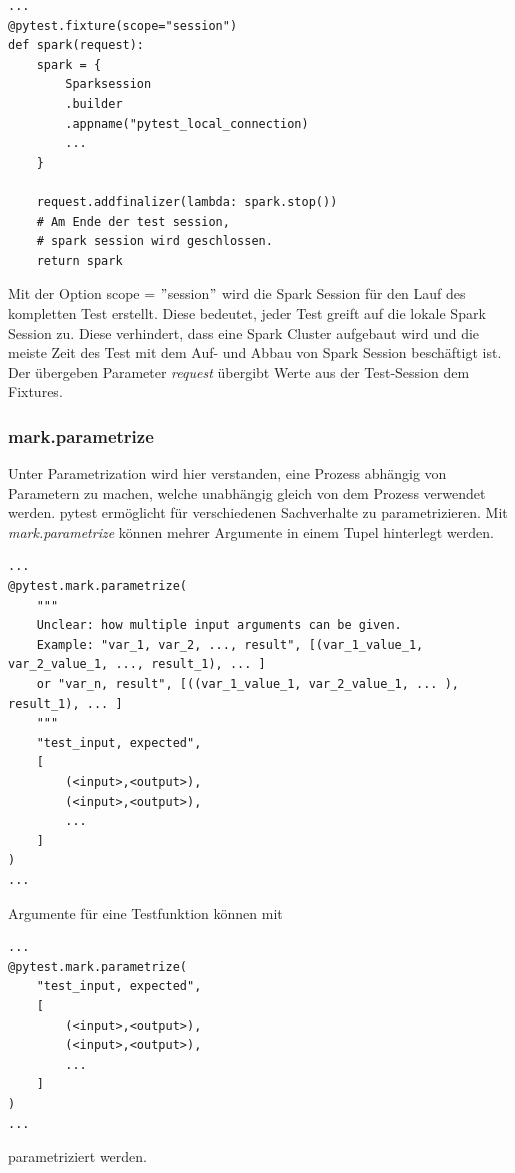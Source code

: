 \begin{lstlisting}[style=Config, caption={Beispiel pyproject.toml; Slapping pytest config}, captionpos=b]
...
@pytest.fixture(scope="session")
def spark(request):
	spark = {
		Sparksession
		.builder
		.appname("pytest_local_connection)
		...
	}
	
	request.addfinalizer(lambda: spark.stop())
	# Am Ende der test session, 
	# spark session wird geschlossen.
    return spark
\end{lstlisting}

Mit der Option scope = $"$session$"$ wird die Spark Session für den Lauf des kompletten Test erstellt. Diese bedeutet, jeder Test greift auf die lokale Spark Session zu. Diese verhindert, dass eine Spark Cluster aufgebaut wird und die meiste Zeit des Test mit dem Auf- und Abbau von Spark Session beschäftigt ist.\\

Der übergeben Parameter \textit{request} übergibt Werte aus der Test-Session dem Fixtures.


\subsubsection{mark.parametrize} 
Unter Parametrization wird hier verstanden, eine Prozess abhängig von Parametern zu machen, welche unabhängig gleich von dem Prozess verwendet werden. pytest ermöglicht für verschiedenen Sachverhalte zu parametrizieren. Mit \textit{mark.parametrize} können mehrer Argumente in einem  Tupel hinterlegt werden.
\begin{lstlisting}[style=python, caption={Example Parametrizing test function with 2 variables}, captionpos=b]
...
@pytest.mark.parametrize(
	"""
	Unclear: how multiple input arguments can be given.
	Example: "var_1, var_2, ..., result", [(var_1_value_1, var_2_value_1, ..., result_1), ... ]
	or "var_n, result", [((var_1_value_1, var_2_value_1, ... ), result_1), ... ]
	"""
	"test_input, expected",	
	[
		(<input>,<output>),
		(<input>,<output>),
		...
	]
)
...
\end{lstlisting}

Argumente für eine Testfunktion können mit
\begin{lstlisting}[style=python, caption={Example Parametrizing test function with 2 variables}, captionpos=b]
...
@pytest.mark.parametrize(
	"test_input, expected",	
	[
		(<input>,<output>),
		(<input>,<output>),
		...
	]
)
...
\end{lstlisting}
parametriziert werden. 

